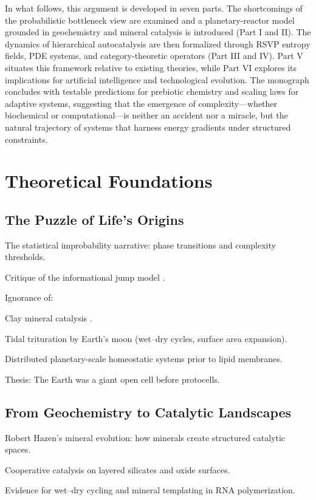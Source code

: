 \documentclass{book}
\begin{document}
In what follows, this argument is developed in seven parts. The shortcomings of the probabilistic bottleneck view are examined and a planetary-reactor model grounded in geochemistry and mineral catalysis is introduced (Part I and II). The dynamics of hierarchical autocatalysis are then formalized through RSVP entropy fields, PDE systems, and category-theoretic operators (Part III and IV). Part V situates this framework relative to existing theories, while Part VI explores its implications for artificial intelligence and technological evolution. The monograph concludes with testable predictions for prebiotic chemistry and scaling laws for adaptive systems, suggesting that the emergence of complexity—whether biochemical or computational—is neither an accident nor a miracle, but the natural trajectory of systems that harness energy gradients under structured constraints.

\part{Theoretical Foundations}

\chapter{The Puzzle of Life’s Origins}
The statistical improbability narrative: phase transitions and complexity thresholds.

Critique of the informational jump model \citep{endres2025}.

Ignorance of:

Clay mineral catalysis \citep{hazen2005}.

Tidal trituration by Earth’s moon (wet–dry cycles, surface area expansion).

Distributed planetary-scale homeostatic systems prior to lipid membranes.

Thesis: The Earth was a giant open cell before protocells.

\chapter{From Geochemistry to Catalytic Landscapes}
Robert Hazen’s mineral evolution: how minerals create structured catalytic spaces.

Cooperative catalysis on layered silicates and oxide surfaces.

Evidence for wet–dry cycling and mineral templating in RNA polymerization.
\end{document}
